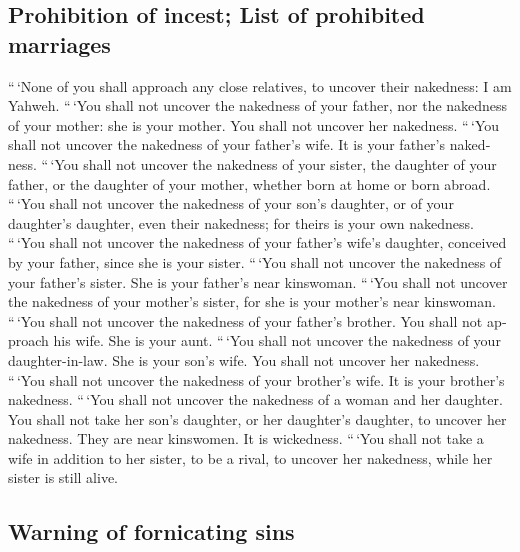 \begin{paracol}{2}
\begin{otherlanguage}{english}
\hypertarget{prohibition-of-incest-list-of-prohibited-marriages}{%
\subsection{Prohibition of incest; List of prohibited
marriages}\label{prohibition-of-incest-list-of-prohibited-marriages}}

 ``\,`None of you shall approach any close relatives, to
uncover their nakedness: I am Yahweh.  ``\,`You shall not
uncover the nakedness of your father, nor the nakedness of your mother:
she is your mother. You shall not uncover her nakedness. 
``\,`You shall not uncover the nakedness of your father's wife. It is
your father's nakedness.  ``\,`You shall not uncover the
nakedness of your sister, the daughter of your father, or the daughter
of your mother, whether born at home or born abroad. 
``\,`You shall not uncover the nakedness of your son's daughter, or of
your daughter's daughter, even their nakedness; for theirs is your own
nakedness.  ``\,`You shall not uncover the nakedness of
your father's wife's daughter, conceived by your father, since she is
your sister.  ``\,`You shall not uncover the nakedness of
your father's sister. She is your father's near kinswoman.
 ``\,`You shall not uncover the nakedness of your
mother's sister, for she is your mother's near kinswoman.
 ``\,`You shall not uncover the nakedness of your
father's brother. You shall not approach his wife. She is your aunt.
 ``\,`You shall not uncover the nakedness of your
daughter-in-law. She is your son's wife. You shall not uncover her
nakedness.  ``\,`You shall not uncover the nakedness of
your brother's wife. It is your brother's nakedness. 
``\,`You shall not uncover the nakedness of a woman and her daughter.
You shall not take her son's daughter, or her daughter's daughter, to
uncover her nakedness. They are near kinswomen. It is wickedness.
 ``\,`You shall not take a wife in addition to her
sister, to be a rival, to uncover her nakedness, while her sister is
still alive.

\hypertarget{warning-of-fornicating-sins}{%
\subsection{Warning of fornicating
sins}\label{warning-of-fornicating-sins}}


\end{otherlanguage}
\end{paracol}
